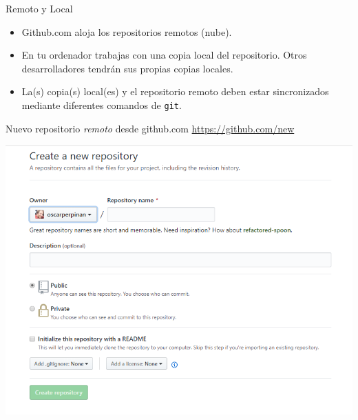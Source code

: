 \documentclass[xcolor={usenames,svgnames,dvipsnames}]{beamer}
\begin{document}
\begin{frame}[label={sec:org046460d},fragile]{Remoto y Local}
 \begin{itemize}
\item \alert{Github.com} aloja los \alert{repositorios remotos} (nube).
\item En tu ordenador trabajas con una \alert{copia local} del repositorio. Otros desarrolladores tendrán sus propias copias locales.
\item La(s) copia(s) local(es) y el repositorio remoto deben estar \alert{sincronizados} mediante diferentes comandos de \texttt{git}.
\end{itemize}
\end{frame}
\begin{frame}[label={sec:orga760d74}]{Nuevo repositorio \emph{remoto} desde github.com}
\url{https://github.com/new}

\begin{center}
\includegraphics[width=.9\linewidth]{figs/GitHub_New_Repository.png}
\end{center}
\end{frame}
\end{document}

